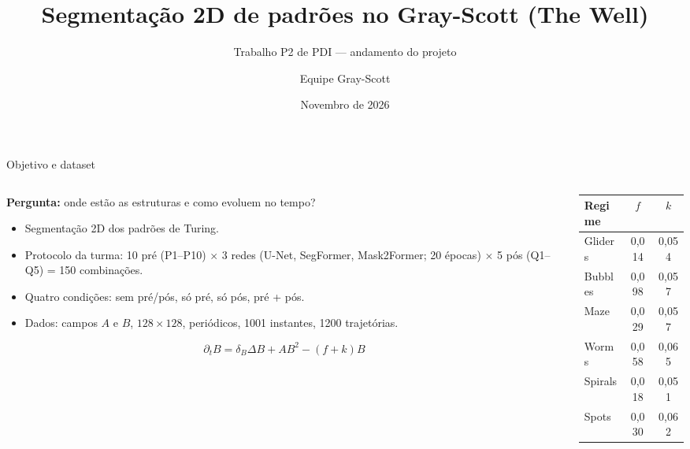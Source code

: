 \documentclass[aspectratio=169,10pt]{beamer}
\title[Segmentação no Gray-Scott]{Segmentação 2D de padrões no Gray-Scott (The Well)}
\subtitle{Trabalho P2 de PDI --- andamento do projeto}
\author{Equipe Gray-Scott}
\institute{UFMA}
\date{Novembro de 2026}
\begin{document}
\begin{frame}
  \titlepage
\end{frame}

\begin{frame}{Objetivo e dataset}
  \begin{columns}[T]
    \begin{column}{0.55\textwidth}
      \textbf{Pergunta:} onde estão as estruturas e como evoluem no tempo?
      \begin{itemize}
        \item Segmentação 2D dos padrões de Turing.
        \item Protocolo da turma: 10 pré (P1--P10) $\times$ 3 redes (U-Net, SegFormer, Mask2Former; 20 épocas) $\times$ 5 pós (Q1--Q5) = 150 combinações.
        \item Quatro condições: sem pré/pós, só pré, só pós, pré + pós.
        \item Dados: campos $A$ e $B$, $128 \times 128$, periódicos, 1001 instantes, 1200 trajetórias.
      \end{itemize}
      \[
      \partial_t B = \delta_B \Delta B + AB^2 - (f+k)B
      \]
    \end{column}
    \begin{column}{0.4\textwidth}
      \centering
      \begin{tabular}{lcc}
        \toprule
        Regime & $f$ & $k$ \\
        \midrule
        Gliders & 0,014 & 0,054 \\
        Bubbles & 0,098 & 0,057 \\
        Maze    & 0,029 & 0,057 \\
        Worms   & 0,058 & 0,065 \\
        Spirals & 0,018 & 0,051 \\
        Spots   & 0,030 & 0,062 \\
        \bottomrule
      \end{tabular}
    \end{column}
  \end{columns}
\end{frame}
\end{document}
